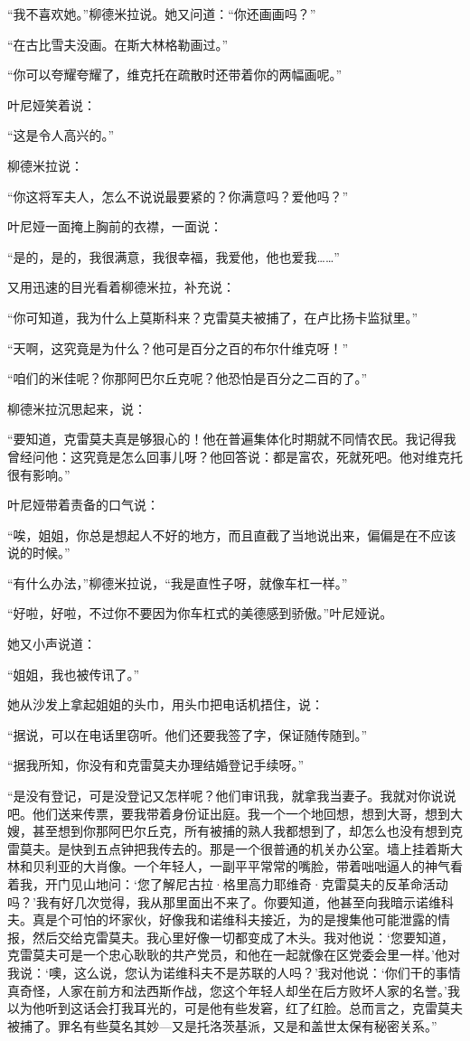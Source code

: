 “我不喜欢她。”柳德米拉说。她又问道：“你还画画吗？”

“在古比雪夫没画。在斯大林格勒画过。”

“你可以夸耀夸耀了，维克托在疏散时还带着你的两幅画呢。”

叶尼娅笑着说：

“这是令人高兴的。”

柳德米拉说：

“你这将军夫人，怎么不说说最要紧的？你满意吗？爱他吗？”

叶尼娅一面掩上胸前的衣襟，一面说：

“是的，是的，我很满意，我很幸福，我爱他，他也爱我……”

又用迅速的目光看着柳德米拉，补充说：

“你可知道，我为什么上莫斯科来？克雷莫夫被捕了，在卢比扬卡监狱里。”

“天啊，这究竟是为什么？他可是百分之百的布尔什维克呀！”

“咱们的米佳呢？你那阿巴尔丘克呢？他恐怕是百分之二百的了。”

柳德米拉沉思起来，说：

“要知道，克雷莫夫真是够狠心的！他在普遍集体化时期就不同情农民。我记得我曾经问他：这究竟是怎么回事儿呀？他回答说：都是富农，死就死吧。他对维克托很有影响。”

叶尼娅带着责备的口气说：

“唉，姐姐，你总是想起人不好的地方，而且直截了当地说出来，偏偏是在不应该说的时候。”

“有什么办法，”柳德米拉说，“我是直性子呀，就像车杠一样。”

“好啦，好啦，不过你不要因为你车杠式的美德感到骄傲。”叶尼娅说。

她又小声说道：

“姐姐，我也被传讯了。”

她从沙发上拿起姐姐的头巾，用头巾把电话机捂住，说：

“据说，可以在电话里窃听。他们还要我签了字，保证随传随到。”

“据我所知，你没有和克雷莫夫办理结婚登记手续呀。”

“是没有登记，可是没登记又怎样呢？他们审讯我，就拿我当妻子。我就对你说说吧。他们送来传票，要我带着身份证出庭。我一个一个地回想，想到大哥，想到大嫂，甚至想到你那阿巴尔丘克，所有被捕的熟人我都想到了，却怎么也没有想到克雷莫夫。是快到五点钟把我传去的。那是一个很普通的机关办公室。墙上挂着斯大林和贝利亚的大肖像。一个年轻人，一副平平常常的嘴脸，带着咄咄逼人的神气看着我，开门见山地问：‘您了解尼古拉·格里高力耶维奇·克雷莫夫的反革命活动吗？’我有好几次觉得，我从那里面出不来了。你要知道，他甚至向我暗示诺维科夫。真是个可怕的坏家伙，好像我和诺维科夫接近，为的是搜集他可能泄露的情报，然后交给克雷莫夫。我心里好像一切都变成了木头。我对他说：‘您要知道，克雷莫夫可是一个忠心耿耿的共产党员，和他在一起就像在区党委会里一样。’他对我说：‘噢，这么说，您认为诺维科夫不是苏联的人吗？’我对他说：‘你们干的事情真奇怪，人家在前方和法西斯作战，您这个年轻人却坐在后方败坏人家的名誉。’我以为他听到这话会打我耳光的，可是他有些发窘，红了红脸。总而言之，克雷莫夫被捕了。罪名有些莫名其妙—又是托洛茨基派，又是和盖世太保有秘密关系。”

